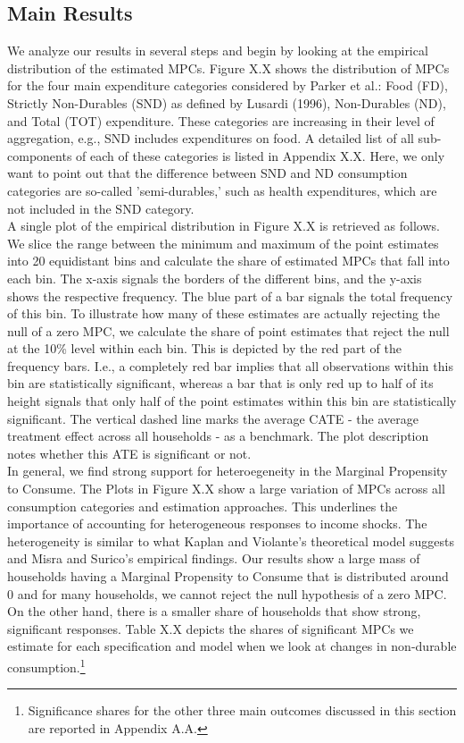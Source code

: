 \subsection{Main Results}
We analyze our results in several steps and begin by looking at the empirical distribution of the estimated MPCs. Figure X.X shows the distribution of MPCs for the four main expenditure categories considered by Parker et al.: Food (FD), Strictly Non-Durables (SND) as defined by Lusardi (1996), Non-Durables (ND), and Total (TOT) expenditure. These categories are increasing in their level of aggregation, e.g., SND includes expenditures on food. A detailed list of all sub-components of each of these categories is listed in Appendix X.X. Here, we only want to point out that the difference between SND and ND consumption categories are so-called 'semi-durables,' such as health expenditures, which are not included in the SND category. \\
A single plot of the empirical distribution in Figure X.X is retrieved as follows. We slice the range between the minimum and maximum of the point estimates into 20 equidistant bins and calculate the share of estimated MPCs that fall into each bin. The x-axis signals the borders of the different bins, and the y-axis shows the respective frequency. The blue part of a bar signals the total frequency of this bin. To illustrate how many of these estimates are actually rejecting the null of a zero MPC, we calculate the share of point estimates that reject the null at the 10\% level within each bin. This is depicted by the red part of the frequency bars. I.e., a completely red bar implies that all observations within this bin are statistically significant, whereas a bar that is only red up to half of its height signals that only half of the point estimates within this bin are statistically significant. The vertical dashed line marks the average CATE - the average treatment effect across all households - as a benchmark. The plot description notes whether this ATE is significant or not. \\ 
In general, we find strong support for heteroegeneity in the Marginal Propensity to Consume. The Plots in Figure X.X show a large variation of MPCs across all consumption categories and estimation approaches. This underlines the importance of accounting for heterogeneous responses to income shocks. The heterogeneity is similar to what Kaplan and Violante’s theoretical model suggests and Misra and Surico’s empirical findings. Our results show a large mass of households having a Marginal Propensity to Consume that is distributed around 0 and for many households, we cannot reject the null hypothesis of a zero MPC. On the other hand, there is a smaller share of households that show strong, significant responses. Table X.X depicts the shares of significant MPCs we estimate for each specification and model when we look at changes in non-durable consumption.\footnote{Significance shares for the other three main outcomes discussed in this section are reported in Appendix A.A.} \\
